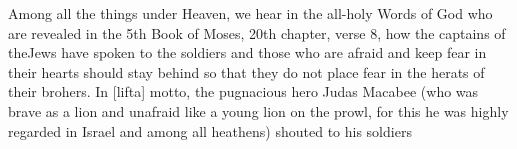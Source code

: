 \newpage


\newpage


Among all the things under Heaven, we hear in the all-holy Words of
God who are revealed in the 5th Book of Moses, 20th chapter,
verse 8, how the captains of theJews have spoken to the soldiers and
those who are afraid and keep fear in their hearts should stay behind
so that they do not place fear in the herats of their brohers. In
[lifta] motto, the pugnacious hero Judas Macabee (who was brave as a
lion and unafraid like a young lion on the prowl, for this he was
highly regarded in Israel and among all heathens) shouted to his
soldiers 